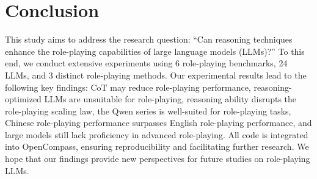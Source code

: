 \section{Conclusion}
This study aims to address the research question: “Can reasoning techniques enhance the role-playing capabilities of large language models (LLMs)?” 
To this end, we conduct extensive experiments using 6 role-playing benchmarks, 24 LLMs, and 3 distinct role-playing methods. 
Our experimental results lead to the following key findings: CoT may reduce role-playing performance, reasoning-optimized LLMs are unsuitable for role-playing, reasoning ability disrupts the role-playing scaling law, the Qwen series is well-suited for role-playing tasks, Chinese role-playing performance surpasses English role-playing performance, and large models still lack proficiency in advanced role-playing.
All code is integrated into OpenCompass, ensuring reproducibility and facilitating further research. 
We hope that our findings provide new perspectives for future studies on role-playing LLMs.